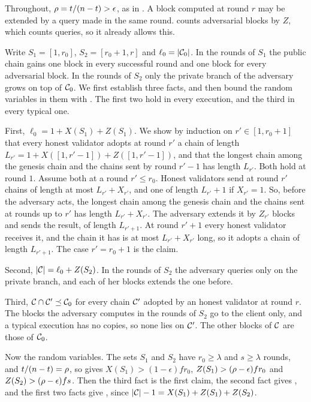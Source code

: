 Throughout, $\rho=t/(n-t)>\epsilon$, as in . A block
computed at round $r$ may be extended by a query made in the same round.
 counts adversarial blocks by $Z$, which counts queries, so it
already allows this.

\begin{proofof}{}
    Write $S_1=[1,r_0]$, $S_2=[r_0+1,r]$ and $\ell_0=\lvert \mathcal{C}_0\rvert$. In the
    rounds of $S_1$ the public chain gains one block in every successful round
    and one block for every adversarial block. In the rounds of $S_2$ only the
    private branch of the adversary grows on top of $\mathcal{C}_0$. We first establish
    three facts, and then bound the random variables in them with
    . The first two hold in every execution, and the third in
    every typical one.

    First, $\ell_0=1+X(S_1)+Z(S_1)$. We show by induction on $r'\in[1,r_0+1]$ that
    every honest validator adopts at round $r'$ a chain of length
    $L_{r'}=1+X([1,r'-1])+Z([1,r'-1])$, and that the longest chain among the
    genesis chain and the chains sent by round $r'-1$ has length $L_{r'}$.
    Both hold at round $1$. Assume both at a round $r'\le r_0$. Honest
    validators send at round $r'$ chains of length at most $L_{r'}+X_{r'}$,
    and one of length $L_{r'}+1$ if $X_{r'}=1$. So, before the adversary acts,
    the longest chain among the genesis chain and the chains sent at rounds up
    to $r'$ has length $L_{r'}+X_{r'}$. The adversary extends it by $Z_{r'}$
    blocks and sends the result, of length $L_{r'+1}$. At round $r'+1$ every
    honest validator receives it, and the chain it has is at most
    $L_{r'}+X_{r'}$ long, so it adopts a chain of length $L_{r'+1}$. The case
    $r'=r_0+1$ is the claim.

    Second, $\lvert \mathcal{C}\rvert=\ell_0+Z(S_2)$. In the rounds of $S_2$ the adversary
    queries only on the private branch, and each of her blocks extends the one
    before.

    Third, $\mathcal{C}\cap\mathcal{C}'\preceq\mathcal{C}_0$ for every chain $\mathcal{C}'$ adopted by an
    honest validator at round $r$. The blocks the adversary computes in the
    rounds of $S_2$ go to the client only, and a typical execution has no
    copies, so none lies on $\mathcal{C}'$. The other blocks of $\mathcal{C}$ are those of
    $\mathcal{C}_0$.

    Now the random variables. The sets $S_1$ and $S_2$ have $r_0\ge\lambda$
    and $s\ge\lambda$ rounds, and $t/(n-t)=\rho$, so  gives
    $X(S_1)>(1-\epsilon)fr_0$, $Z(S_1)>(\rho-\epsilon)fr_0$ and
    $Z(S_2)>(\rho-\epsilon)fs$. Then the third fact is the first claim, the
    second fact gives , and the first two facts give
    , since $\lvert \mathcal{C}\rvert-1=X(S_1)+Z(S_1)+Z(S_2)$.
\end{proofof}

